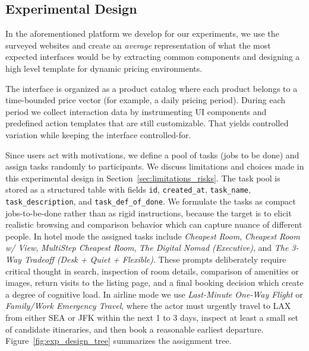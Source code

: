 \subsection{Experimental Design}

In the aforementioned platform we develop for our experiments, we use the surveyed websites and create an \textit{average} representation of what the most expected interfaces would be by extracting common components and designing a high level template for dynamic pricing environments.


The interface is organized as a product catalog where each product belongs to a time-bounded price vector (for example, a daily pricing period). During each period we collect interaction data by instrumenting UI components and predefined action templates that are still customizable. That yields controlled variation while keeping the interface controlled-for.

Since users act with motivations, we define a pool of tasks (jobs to be done) and assign tasks randomly to participants.
We discuss limitations and choices made in this experimental design in Section~\ref{sec:limitations_risks}.
The task pool is stored as a structured table with fields \texttt{id}, \texttt{created\_at}, \texttt{task\_name}, \texttt{task\_description}, and \texttt{task\_def\_of\_done}. We formulate the tasks as compact jobs-to-be-done rather than as rigid instructions, because the target is to elicit realistic browsing and comparison behavior which can capture nuance of different people. In hotel mode the assigned tasks include \textit{Cheapest Room}, \textit{Cheapest Room w/ View}, \textit{MultiStep Cheapest Room}, \textit{The Digital Nomad (Executive)}, and \textit{The 3-Way Tradeoff (Desk + Quiet + Flexible)}. These prompts deliberately require critical thought in search, inspection of room details, comparison of amenities or images, return visits to the listing page, and a final booking decision which create a degree of cognitive load. In airline mode we use \textit{Last-Minute One-Way Flight} or \textit{Family/Work Emergency Travel}, where the actor must urgently travel to LAX from either SEA or JFK within the next 1 to 3 days, inspect at least a small set of candidate itineraries, and then book a reasonable earliest departure. Figure~\ref{fig:exp_design_tree} summarizes the assignment tree.

